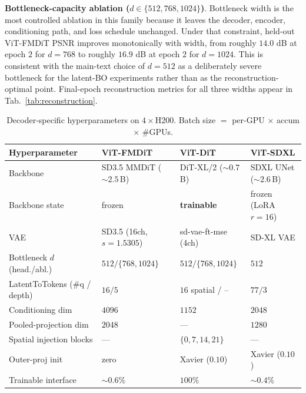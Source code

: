 \documentclass{article}
\begin{document}
\textbf{Bottleneck-capacity ablation ($d\in\{512,768,1024\}$)}. Bottleneck width is the most controlled ablation in this family because it leaves the decoder, encoder, conditioning path, and loss schedule unchanged. Under that constraint, held-out ViT-FMDiT PSNR improves monotonically with width, from roughly $14.0$ dB at epoch $2$ for $d{=}768$ to roughly $16.9$ dB at epoch $2$ for $d{=}1024$. This is consistent with the main-text choice of $d{=}512$ as a deliberately severe bottleneck for the latent-BO experiments rather than as the reconstruction-optimal point. Final-epoch reconstruction metrics for all three widths appear in Tab.~\ref{tab:reconstruction}.


\begin{table}[!ht]
  \caption{Decoder-specific hyperparameters on $4{\times}$H200. Batch size $=$ per-GPU $\times$ accum $\times$ \#GPUs.}
  \label{tab:hparams-decoder}
  \centering
  \footnotesize
  \setlength{\tabcolsep}{3pt}
  \begin{tabularx}{\linewidth}{@{}l X X X@{}}
    \toprule
    Hyperparameter & ViT-FMDiT & ViT-DiT & ViT-SDXL \\
    \midrule
    Backbone                          & SD3.5 MMDiT (${\sim}2.5$\,B) & DiT-XL/2 (${\sim}0.7$\,B) & SDXL UNet (${\sim}2.6$\,B) \\
    Backbone state                    & frozen        & \textbf{trainable}      & frozen \,(LoRA $r{=}16$) \\
    VAE                               & SD3.5 (16ch, $s{=}1.5305$) & sd-vae-ft-mse (4ch) & SD-XL VAE \\
    Bottleneck $d$ (head./abl.)       & $512/\{768,1024\}$ & $512/\{768,1024\}$ & $512$ \\
    LatentToTokens (\#q / depth)      & $16 / 5$      & $16$ spatial / --        & $77 / 3$ \\
    Conditioning dim                  & $4096$        & $1152$                   & $2048$ \\
    Pooled-projection dim             & $2048$        & ---                      & $1280$ \\
    Spatial injection blocks          & ---           & $\{0,7,14,21\}$          & --- \\
    Outer-proj init                   & zero          & Xavier ($0.10$)          & Xavier ($0.10$) \\
    Trainable interface               & ${\sim}0.6\%$ & $100\%$                  & ${\sim}0.4\%$ \\
    \midrule

\end{tabularx}
\end{table}
\end{document}
